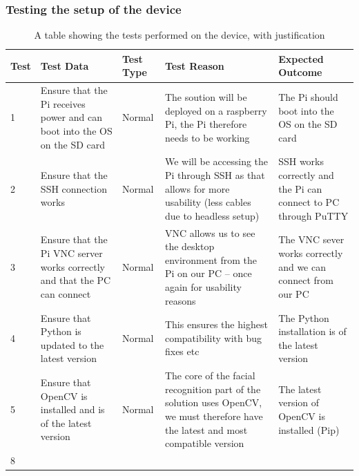 \documentclass[9pt]{article}
\begin{document}
\subsubsection{Testing the setup of the device}
\begin{table}[H]
	\centering
	\begin{tabularx}{\textwidth}{lXlXX}
		\textbf{Test} & \textbf{Test Data}                                                        & \textbf{Test Type} & \textbf{Test Reason}                                                                                                               & \textbf{Expected Outcome}                                      \\ \midrule
		1             & Ensure that the Pi receives power and can boot into the OS on the SD card & Normal             & The soution will be deployed on a raspberry Pi, the Pi therefore needs to be working                                               & The Pi should boot into the OS on the SD card                  \\
		2             & Ensure that the SSH connection works                                      & Normal             & We will be accessing the Pi through SSH as that allows for more usability (less cables due to headless setup)                      & SSH works correctly and the Pi can connect to PC through PuTTY \\
		3             & Ensure that the Pi VNC server works correctly and that the PC can connect & Normal             & VNC allows us to see the desktop environment from the Pi on our PC -- once again for usability reasons                             & The VNC sever works correctly and we can connect from our PC   \\
		4             & Ensure that Python is updated to the latest version                       & Normal             & This ensures the highest compatibility with bug fixes etc                                                                          & The Python installation is of the latest version               \\
		5             & Ensure that OpenCV is installed and is of the latest version              & Normal             & The core of the facial recognition part of the solution uses OpenCV, we must therefore have the latest and most compatible version & The latest version of OpenCV is installed (Pip)                \\
		8             &                                                                           &                    &                                                                                                                                    &                                                                \\ \bottomrule
	\end{tabularx}
	\caption{A table showing the tests performed on the device, with justification}
	\label{tab_testingDesignDevice}
\end{table}
\end{document}
